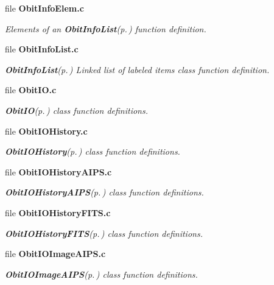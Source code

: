 \begin{CompactItemize}
\item 
file {\bf Obit\-Info\-Elem.c}
\begin{CompactList}\small\item\em Elements of an {\bf Obit\-Info\-List}{\rm (p.\,\pageref{structObitInfoList})} function definition. \item\end{CompactList}

\item 
file {\bf Obit\-Info\-List.c}
\begin{CompactList}\small\item\em {\bf Obit\-Info\-List}{\rm (p.\,\pageref{structObitInfoList})} Linked list of labeled items class function definition. \item\end{CompactList}

\item 
file {\bf Obit\-IO.c}
\begin{CompactList}\small\item\em {\bf Obit\-IO}{\rm (p.\,\pageref{structObitIO})} class function definitions. \item\end{CompactList}

\item 
file {\bf Obit\-IOHistory.c}
\begin{CompactList}\small\item\em {\bf Obit\-IOHistory}{\rm (p.\,\pageref{structObitIOHistory})} class function definitions. \item\end{CompactList}

\item 
file {\bf Obit\-IOHistory\-AIPS.c}
\begin{CompactList}\small\item\em {\bf Obit\-IOHistory\-AIPS}{\rm (p.\,\pageref{structObitIOHistoryAIPS})} class function definitions. \item\end{CompactList}

\item 
file {\bf Obit\-IOHistory\-FITS.c}
\begin{CompactList}\small\item\em {\bf Obit\-IOHistory\-FITS}{\rm (p.\,\pageref{structObitIOHistoryFITS})} class function definitions. \item\end{CompactList}

\item 
file {\bf Obit\-IOImage\-AIPS.c}
\begin{CompactList}\small\item\em {\bf Obit\-IOImage\-AIPS}{\rm (p.\,\pageref{structObitIOImageAIPS})} class function definitions. \item\end{CompactList}


\end{CompactItemize}
